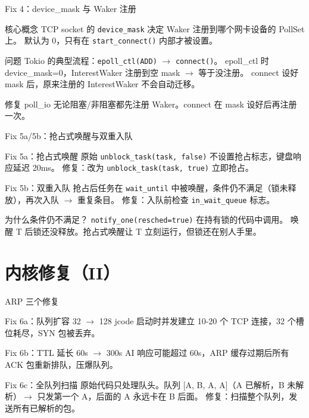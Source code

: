 \documentclass{beamer}
\begin{document}
\begin{frame}{Fix 4：device\_mask 与 Waker 注册}
  \begin{block}{核心概念}
    TCP socket 的 \texttt{device\_mask} 决定 Waker 注册到哪个网卡设备的 PollSet 上。
    默认为 0，只有在 \texttt{start\_connect()} 内部才被设置。
  \end{block}
  \begin{block}{问题}
    Tokio 的典型流程：\texttt{epoll\_ctl(ADD)} $\to$ \texttt{connect()}。
    epoll\_ctl 时 device\_mask=0，InterestWaker 注册到空 mask $\to$ 等于没注册。
    connect 设好 mask 后，原来注册的 InterestWaker 不会自动迁移。
  \end{block}
  \begin{block}{修复}
    poll\_io 无论阻塞/非阻塞都先注册 Waker。connect 在 mask 设好后再注册一次。
  \end{block}
\end{frame}

\begin{frame}{Fix 5a/5b：抢占式唤醒与双重入队}
  \begin{block}{Fix 5a：抢占式唤醒}
    原始 \texttt{unblock\_task(task, false)} 不设置抢占标志，键盘响应延迟 20ms。
    修复：改为 \texttt{unblock\_task(task, true)} 立即抢占。
  \end{block}
  \begin{block}{Fix 5b：双重入队}
    抢占后任务在 \texttt{wait\_until} 中被唤醒，条件仍不满足（锁未释放），再次入队 $\to$ 重复条目。
    修复：入队前检查 \texttt{in\_wait\_queue} 标志。
  \end{block}
  \begin{block}{为什么条件仍不满足？}
    \texttt{notify\_one(resched=true)} 在持有锁的代码中调用。
    唤醒 T 后锁还没释放。抢占式唤醒让 T 立刻运行，但锁还在别人手里。
  \end{block}
\end{frame}

\section{内核修复（II）}

\begin{frame}{ARP 三个修复}
  \begin{block}{Fix 6a：队列扩容 32 $\to$ 128}
    jcode 启动时并发建立 10-20 个 TCP 连接，32 个槽位耗尽，SYN 包被丢弃。
  \end{block}
  \begin{block}{Fix 6b：TTL 延长 60s $\to$ 300s}
    AI 响应可能超过 60s，ARP 缓存过期后所有 ACK 包重新排队，压爆队列。
  \end{block}
  \begin{block}{Fix 6c：全队列扫描}
    原始代码只处理队头。队列 [A, B, A, A]（A 已解析，B 未解析）$\to$ 只发第一个 A，后面的 A 永远卡在 B 后面。
    修复：扫描整个队列，发送所有已解析的包。
  \end{block}
\end{frame}
\end{document}
